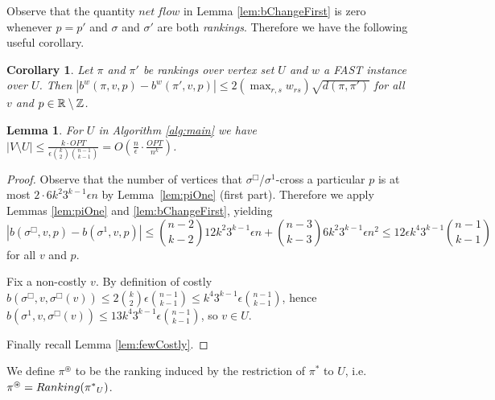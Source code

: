 \documentclass[dvips,11pt,letter]{article}
\newcommand{\sm}{\setminus} \newcommand{\compl}[1]{\overline{#1}}                \newcommand{\floor}[1]{\left\lfloor #1 \right\rfloor}
\newtheorem{corollary}[theorem]{Corollary}
\newtheorem{lemma}[theorem]{Lemma}
\newcommand{\roundOpt}{\sigma^{\Box}}
\newcommand{\costlyB}{2 \binom{k}{2} \epsilon \binom{n-1}{k-1}}
\begin{document}
Observe that the quantity $net\ flow$ in Lemma \ref{lem:bChangeFirst} is zero whenever $p=p'$ and $\sigma$ and $\sigma'$ are both \emph{rankings}. Therefore we have the following useful corollary.

\begin{corollary} \label{lem:fastSVMlandscape}
Let $\pi$ and $\pi'$ be rankings over vertex set $U$ and $w$ a FAST instance over $U$. Then $|b^w(\pi, v, p) - b^w(\pi', v, p)| \le 2 (\max_{r,s} w_{rs}) \sqrt{d(\pi,\pi')}$ for all $v$ and $p \in \R \sm \Z$.
\end{corollary}

\begin{lemma}\label{lem:Usmall}
For $U$ in Algorithm \ref{alg:main} we have
$|V \sm U| \le \frac{k \cdot OPT}{\epsilon \binom{k}{2}\binom{n-1}{k-1}} = O( \frac{n}{\epsilon} \cdot \frac{OPT}{n^k})$.
\end{lemma}
\begin{proof}
Observe that the number of vertices that $\roundOpt$/$\sigma^1$-cross a particular $p$ is at most $2 \cdot 6k^2 3^{k-1} \epsilon n$ by Lemma~\ref{lem:piOne} (first part). Therefore we apply Lemmas \ref{lem:piOne} and \ref{lem:bChangeFirst}, yielding
\begin{equation}
|b(\roundOpt, v, p) - b(\sigma^1, v, p)| \le \binom{n-2}{k-2}12k^2 3^{k-1}\epsilon n + \binom{n-3}{k-3} 6k^2 3^{k-1}\epsilon n^2 \le 12\epsilon k^4 3^{k-1}\binom{n-1}{k-1} \label{eqn:s1bClose}
\end{equation}
for all $v$ and $p$.

Fix a non-costly $v$. By definition of costly $b(\roundOpt, v, \roundOpt(v)) \le \costlyB \le k^4 3^{k-1} \epsilon \binom{n-1}{k-1}$, hence $b(\sigma^1, v, \roundOpt(v)) \le 13 k^4 3^{k-1} \epsilon \binom{n-1}{k-1}$, so $v \in U$.

Finally recall Lemma \ref{lem:fewCostly}.
\end{proof}

We define $\pi^\circledast$ to be the ranking induced by the restriction of $\pi^*$ to $U$, i.e.\ $\pi^\circledast = Ranking({\pi^*}_{U})$.
\end{document}
